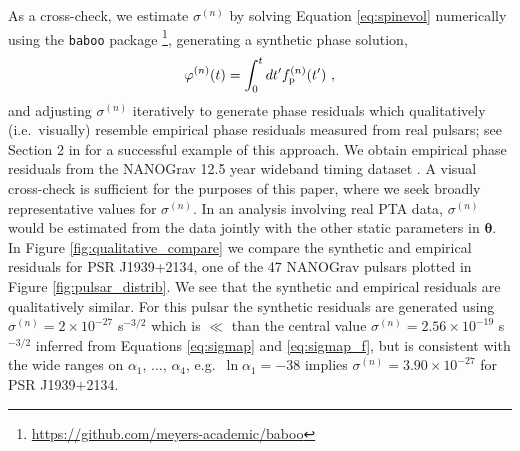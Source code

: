 \documentclass[fleqn,usenatbib,useAMS]{mnras}
\providecommand{\DIFadd}[1]{{\protect\color{blue}\uwave{#1}}} %
\providecommand{\DIFdel}[1]{{\protect\color{red}\sout{#1}}}                      %
\providecommand{\DIFaddbegin}{} %
\providecommand{\DIFaddend}{} %
\providecommand{\DIFdelbegin}{} %
\providecommand{\DIFdelend}{} %
\newcommand{\DIFscaledelfig}{0.5}
\newlength{\DIFdelgraphicswidth} %
\newlength{\DIFdelgraphicsheight} %
\newcommand{\DIFaddincludegraphics}[2][]{{\color{blue}\fbox{\DIFOincludegraphics[#1]{#2}}}} %
\newcommand{\DIFdelincludegraphics}[2][]{%
\sbox{\DIFdelgraphicsbox}{\DIFOincludegraphics[#1]{#2}}%
\settoboxwidth{\DIFdelgraphicswidth}{\DIFdelgraphicsbox} %
\settoboxtotalheight{\DIFdelgraphicsheight}{\DIFdelgraphicsbox} %
\scalebox{\DIFscaledelfig}{%
\parbox[b]{\DIFdelgraphicswidth}{\usebox{\DIFdelgraphicsbox}\\[-\baselineskip] \rule{\DIFdelgraphicswidth}{0em}}\llap{\resizebox{\DIFdelgraphicswidth}{\DIFdelgraphicsheight}{%
\setlength{\unitlength}{\DIFdelgraphicswidth}%
\begin{picture}(1,1)%
\thicklines\linethickness{2pt} %
{\color[rgb]{1,0,0}\put(0,0){\framebox(1,1){}}}%
{\color[rgb]{1,0,0}\put(0,0){\line( 1,1){1}}}%
{\color[rgb]{1,0,0}\put(0,1){\line(1,-1){1}}}%
\end{picture}%
}\hspace*{3pt}}} %
} %
\DeclareRobustCommand{\DIFaddbegin}{\DIFOaddbegin \let\includegraphics\DIFaddincludegraphics} %
\DeclareRobustCommand{\DIFaddend}{\DIFOaddend \let\includegraphics\DIFOincludegraphics} %
\DeclareRobustCommand{\DIFdelbegin}{\DIFOdelbegin \let\includegraphics\DIFdelincludegraphics} %
\DeclareRobustCommand{\DIFdelend}{\DIFOaddend \let\includegraphics\DIFOincludegraphics} %
\begin{document}
As a cross-check, we estimate $\sigma^{(n)}$ by solving Equation \eqref{eq:spinevol} numerically using the \texttt{baboo} package \footnote{\url{https://github.com/meyers-academic/baboo}}, generating a synthetic phase solution,
\begin{eqnarray}
	\varphi^{(n)}(t) = \int_0^t dt' f^{(n)}_{\rm p}(t') \ ,
\end{eqnarray}
and adjusting $\sigma^{(n)}$ iteratively to generate phase residuals which qualitatively (i.e.\ visually) resemble empirical phase residuals measured from real pulsars; see Section 2 in \cite{Vargas} for a successful example of this approach. We obtain empirical phase residuals from the NANOGrav 12.5 year wideband timing dataset \citep{pennucci_timothy_t_2020_4312887,nanogravwideband}. A visual cross-check is sufficient for the purposes of this paper, where we seek broadly representative values for $\sigma^{(n)}$. In an analysis involving real PTA data, $\sigma^{(n)}$ would be estimated from the data jointly with the other static parameters in ${\boldsymbol{\theta}}$. In Figure \ref{fig:qualitative_compare} we compare the synthetic and empirical residuals for PSR J1939+2134, one of the 47 NANOGrav pulsars plotted in Figure \ref{fig:pulsar_distrib}. We see that the synthetic and empirical residuals are qualitatively similar. For this pulsar the synthetic residuals are generated using $\sigma^{(n)} = 2 \times 10^{-27}$ s$^{-3/2}$ which is \DIFdelbegin \DIFdel{$\ll$ }\DIFdelend \DIFaddbegin \DIFadd{much less }\DIFaddend than the central value $\sigma^{(n)} = 2.56 \times 10^{-19}$ s$^{-3/2}$ inferred from Equations \eqref{eq:sigmap} and \eqref{eq:sigmap_f}, but is consistent with the wide ranges on $\alpha_1$, $\dots$, $\alpha_4$, e.g.\ $\ln \alpha_1 = -38$ implies $\sigma^{(n)}= 3.90 \times 10^{-27}$ for PSR J1939$+$2134.

\end{document}
